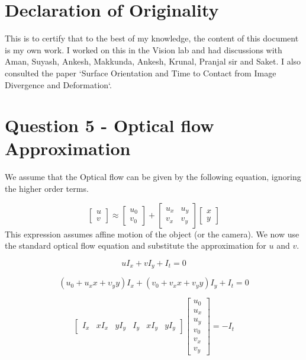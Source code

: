 \documentclass[12pt]{article}
\author{
  Singhal, Madhur\\
  \texttt{2015CS10235}
}
\begin{document}
\maketitle


\section{Declaration of Originality}
This is to certify that to the best of my knowledge, the content of this document is my own work. I worked on this in the Vision lab and had discussions with Aman, Suyash, Ankesh, Makkunda, Ankesh, Krunal, Pranjal sir and Saket. I also consulted the paper `Surface Orientation and Time to Contact from Image Divergence and Deformation`. 


\paragraph{}

\section{Question 5 - Optical flow Approximation}
We assume that the Optical flow can be given by the following equation, ignoring the higher order terms.

$$
\left[ \begin{matrix} u\\ v\end{matrix} \right] \approx \left[ \begin{matrix} u_{0}\\ v_{0}\end{matrix} \right] +\left[ \begin{matrix} u_{x} & u_{y}\\ v_{x} & v_{y}\end{matrix} \right] \left[ \begin{matrix} x\\ y\end{matrix} \right] 
$$
This expression assumes  affine motion of the object (or the camera). We now use the standard optical flow equation and substitute the approximation for $u$ and $v$.

$$uI_{x}+vI_{y}+I_{t}=0$$

$$
\left(  u_{0}+u_{x}x+\upsilon _{y}y\right) I_{x} +\left( v_{0}+v_{x}x+v_{y}y\right) I_{y} + I_{t} = 0
$$

$$
\left[ \begin{matrix} I_{x} & xI_{x} & yI_{y} & I_{y} & xI_{y}&yI_{y}\end{matrix} \right] \left[ \begin{matrix} u_{0} \\ u_{x} \\ u_{y} \\ v_{0} \\v_{x}\\v_{y}\end{matrix} \right] = -I_{t}
$$
\end{document}
